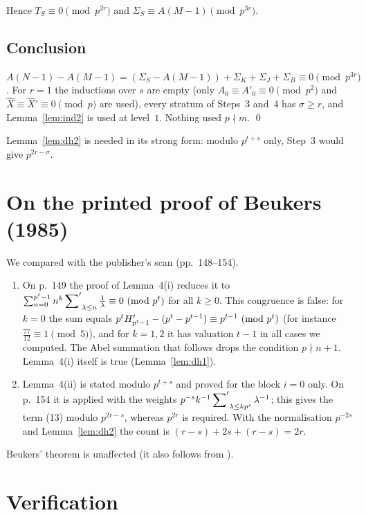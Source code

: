 \documentclass[11pt]{amsart}
\begin{document}
Hence $T_S\equiv0\pmod{p^{2r}}$ and $\Sigma_S\equiv A(M-1)\pmod{p^{3r}}$.

\subsection{Conclusion}
$A(N-1)-A(M-1)=(\Sigma_S-A(M-1))+\Sigma_K+\Sigma_J+\Sigma_B\equiv0\pmod{p^{3r}}$. For $r=1$ the inductions over $s$ are empty (only $A_0\equiv A'_0\equiv0\pmod{p^2}$ and $\hat X\equiv\hat X'\equiv0\pmod p$ are used), every stratum of Steps~3 and~4 has $\sigma\ge r$, and Lemma~\ref{lem:ind2} is used at level~$1$. Nothing used $p\nmid m$. \qed

\begin{remark}
Lemma~\ref{lem:dh2} is needed in its strong form: modulo $p^{t+s}$ only, Step~3 would give $p^{2r-\sigma}$.
\end{remark}

\section{On the printed proof of Beukers (1985)}\label{sec:beukers}
We compared \cite{beukers1985} with the publisher's scan (pp.~148--154).
\begin{enumerate}
\item On p.~149 the proof of Lemma~4(i) reduces it to $\sum_{n=0}^{p^t-1}n^k\sideset{}{'}\sum_{\lambda\le n}\frac1\lambda\equiv0\ (\mathrm{mod}\ p^t)$ for all $k\ge0$. This congruence is false: for $k=0$ the sum equals $p^tH'_{p^t-1}-(p^t-p^{t-1})\equiv p^{t-1}\ (\mathrm{mod}\ p^t)$ (for instance $\frac{77}{12}\equiv1\pmod5$), and for $k=1,2$ it has valuation $t-1$ in all cases we computed. The Abel summation that follows drops the condition $p\nmid n+1$. Lemma~4(i) itself is true (Lemma~\ref{lem:dh1}).
\item Lemma~4(ii) is stated modulo $p^{t+s}$ and proved for the block $i=0$ only. On p.~154 it is applied with the weights $p^{-s}k^{-1}\sideset{}{'}\sum_{\lambda\le kp^s}\lambda^{-1}$; this gives the term (13) modulo $p^{2r-s}$, whereas $p^{2r}$ is required. With the normalisation $p^{-2s}$ and Lemma~\ref{lem:dh2} the count is $(r-s)+2s+(r-s)=2r$.
\end{enumerate}
Beukers' theorem is unaffected (it also follows from \cite{coster1988,straub2014}).

\section{Verification}\label{sec:verification}\label{sec:verif}
\end{document}
